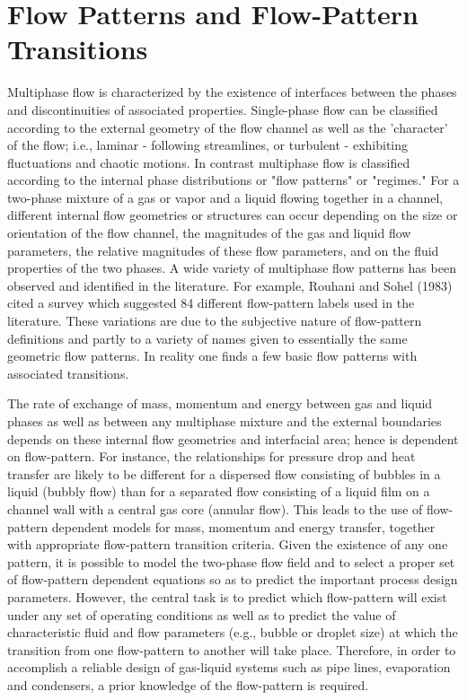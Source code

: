 \chapter{Flow Patterns and Flow-Pattern Transitions}

Multiphase flow is characterized by the existence of interfaces between the phases and discontinuities of associated properties.
Single-phase flow can be classified according to the external geometry of the flow channel as well as the 'character' of the flow; i.e., laminar - following streamlines, or turbulent - exhibiting fluctuations and chaotic motions.
In contrast multiphase flow is classified according to the internal phase distributions or "flow patterns" or "regimes."
For a two-phase mixture of a gas or vapor and a liquid flowing together in a channel, different internal flow geometries or structures can occur depending on the size or orientation of the flow channel, the magnitudes of the gas and liquid flow parameters, the relative magnitudes of these flow parameters, and on the fluid properties of the two phases.
A wide variety of multiphase flow patterns has been observed and identified in the literature.
For example, Rouhani and Sohel (1983) cited a survey which suggested 84 different flow-pattern labels used in the literature.
These variations are due to the subjective nature of flow-pattern definitions and partly to a variety of names given to essentially the same geometric flow patterns.
In reality one finds a few basic flow patterns with associated transitions.

The rate of exchange of mass, momentum and energy between gas and liquid phases as well as between any multiphase mixture and the external boundaries depends on these internal flow geometries and interfacial area; hence is dependent on flow-pattern.
For instance, the relationships for pressure drop and heat transfer are likely to be different for a dispersed flow consisting of bubbles in a liquid (bubbly flow) than for a separated flow consisting of a liquid film on a channel wall with a central gas core (annular flow).
This leads to the use of flow-pattern dependent models for mass, momentum and energy transfer, together with appropriate flow-pattern transition criteria.
Given the existence of any one pattern, it is possible to model the two-phase flow field and to select a proper set of flow-pattern dependent equations so as to predict the important process design parameters.
However, the central task is to predict which flow-pattern will exist under any set of operating conditions as well as to predict the value of characteristic fluid and flow parameters (e.g., bubble or droplet size) at which the transition from one flow-pattern to another will take place.
Therefore, in order to accomplish a reliable design of gas-liquid systems such as pipe lines, evaporation and condensers, a prior knowledge of the flow-pattern is required.

